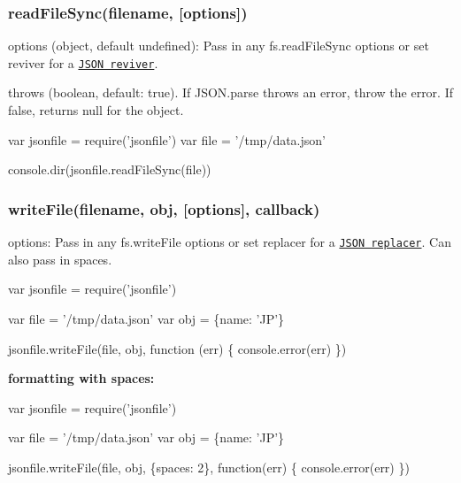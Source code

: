 \subsubsection*{read\+File\+Sync(filename, \mbox{[}options\mbox{]})}

{\ttfamily options} ({\ttfamily object}, default {\ttfamily undefined})\+: Pass in any {\ttfamily fs.\+read\+File\+Sync} options or set {\ttfamily reviver} for a \href{https://developer.mozilla.org/en-US/docs/Web/JavaScript/Reference/Global_Objects/JSON/parse}{\tt J\+S\+ON reviver}.
\begin{DoxyItemize}
\item {\ttfamily throws} ({\ttfamily boolean}, default\+: {\ttfamily true}). If {\ttfamily J\+S\+O\+N.\+parse} throws an error, throw the error. If {\ttfamily false}, returns {\ttfamily null} for the object.
\end{DoxyItemize}


\begin{DoxyCode}
var jsonfile = require('jsonfile')
var file = '/tmp/data.json'

console.dir(jsonfile.readFileSync(file))
\end{DoxyCode}


\subsubsection*{write\+File(filename, obj, \mbox{[}options\mbox{]}, callback)}

{\ttfamily options}\+: Pass in any {\ttfamily fs.\+write\+File} options or set {\ttfamily replacer} for a \href{https://developer.mozilla.org/en-US/docs/Web/JavaScript/Reference/Global_Objects/JSON/stringify}{\tt J\+S\+ON replacer}. Can also pass in {\ttfamily spaces}.


\begin{DoxyCode}
var jsonfile = require('jsonfile')

var file = '/tmp/data.json'
var obj = \{name: 'JP'\}

jsonfile.writeFile(file, obj, function (err) \{
  console.error(err)
\})
\end{DoxyCode}


{\bfseries formatting with spaces\+:}


\begin{DoxyCode}
var jsonfile = require('jsonfile')

var file = '/tmp/data.json'
var obj = \{name: 'JP'\}

jsonfile.writeFile(file, obj, \{spaces: 2\}, function(err) \{
  console.error(err)
\})
\end{DoxyCode}


